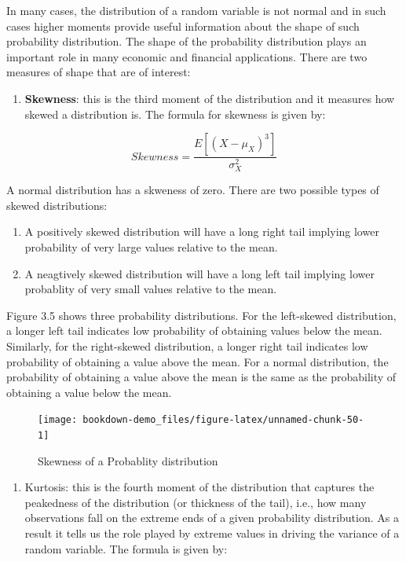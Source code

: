\documentclass[]{book}
\providecommand{\tightlist}{%
  \setlength{\itemsep}{0pt}\setlength{\parskip}{0pt}}
\theoremstyle{definition}
\theoremstyle{definition}
\theoremstyle{definition}
\theoremstyle{remark}
\begin{document}
In many cases, the distribution of a random variable is not normal and in such cases higher moments provide useful information about the shape of such probability distribution. The shape of the probability distribution plays an important role in many economic and financial applications. There are two measures of shape that are of interest:

\begin{enumerate}
\def\labelenumi{\arabic{enumi}.}
\tightlist
\item
  \textbf{Skewness}: this is the third moment of the distribution and it measures how skewed a distribution is. The formula for skewness is given by:
\end{enumerate}

\[Skewness=\frac{E[(X-\mu_X)^3]}{\sigma^2_X}\]

A normal distribution has a skweness of zero. There are two possible types of skewed distributions:

\begin{enumerate}
\def\labelenumi{\alph{enumi}.}
\item
  A positively skewed distribution will have a long right tail implying lower probability of very large values relative to the mean.
\item
  A neagtively skewed distribution will have a long left tail implying lower probablity of very small values relative to the mean.
\end{enumerate}

Figure 3.5 shows three probability distributions. For the left-skewed distribution, a longer left tail indicates low probability of obtaining values below the mean. Similarly, for the right-skewed distribution, a longer right tail indicates low probability of obtaining a value above the mean. For a normal distribution, the probability of obtaining a value above the mean is the same as the probability of obtaining a value below the mean.

\begin{figure}

{\centering \texttt{[image: bookdown-demo\_files/figure-latex/unnamed-chunk-50-1]} 

}

\caption{Skewness of a Probablity distribution}\label{fig:unnamed-chunk-50}
\end{figure}

\begin{enumerate}
\def\labelenumi{\arabic{enumi}.}
\setcounter{enumi}{1}
\tightlist
\item
  Kurtosis: this is the fourth moment of the distribution that captures the peakedness of the distribution (or thickness of the tail), i.e., how many observations fall on the extreme ends of a given probability distribution. As a result it tells us the role played by extreme values in driving the variance of a random variable. The formula is given by:
\end{enumerate}
\end{document}

